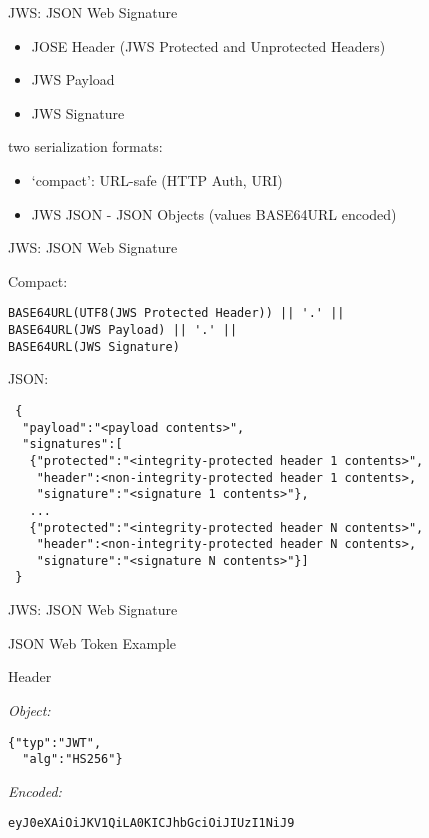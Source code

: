 \begin{frame}{JWS: JSON Web Signature}

\begin{itemize}
\itemsep1pt\parskip0pt
\item
  JOSE Header (JWS Protected and Unprotected Headers)
\item
  JWS Payload
\item
  JWS Signature
\end{itemize}

two serialization formats:

\begin{itemize}
\itemsep1pt\parskip0pt
\item
  `compact': URL-safe (HTTP Auth, URI)
\item
  JWS JSON - JSON Objects (values BASE64URL encoded)
\end{itemize}

\end{frame}

\begin{frame}[fragile]{JWS: JSON Web Signature}

Compact:

\small

\begin{verbatim}
BASE64URL(UTF8(JWS Protected Header)) || '.' ||
BASE64URL(JWS Payload) || '.' ||
BASE64URL(JWS Signature)
\end{verbatim}

JSON:

\small

\begin{verbatim}
 {
  "payload":"<payload contents>",
  "signatures":[
   {"protected":"<integrity-protected header 1 contents>",
    "header":<non-integrity-protected header 1 contents>,
    "signature":"<signature 1 contents>"},
   ...
   {"protected":"<integrity-protected header N contents>",
    "header":<non-integrity-protected header N contents>,
    "signature":"<signature N contents>"}]
 }
\end{verbatim}

\end{frame}

\begin{frame}[fragile]{JWS: JSON Web Signature}

JSON Web Token Example

\begin{block}{Header}

\emph{Object:}

\begin{verbatim}
{"typ":"JWT",
  "alg":"HS256"}
\end{verbatim}

\emph{Encoded:}

\begin{verbatim}
eyJ0eXAiOiJKV1QiLA0KICJhbGciOiJIUzI1NiJ9
\end{verbatim}

\end{block}

\end{frame}

